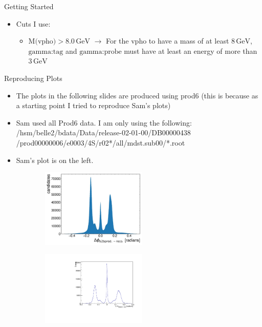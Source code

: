 \documentclass[10pt]{beamer}
\begin{document}
{\begin{frame}{Getting Started}
\begin{itemize}
\end{itemize}

\begin{itemize}
	\item Cuts I use:
	\begin{itemize}
		\item $\textrm{M(vpho)}>8.0\, \textrm{GeV}$ $\rightarrow$ For the vpho to have a mass of at least $8\,\textrm{GeV}$, $\textrm{gamma:tag}$ and $\textrm{gamma:probe}$ must have at least an energy of more than $3\,\textrm{GeV}$
	
	\end{itemize}
\end{itemize}

	
\end{frame}

\begin{frame}{Reproducing Plots}
	
	\begin{itemize}
		\item The plots in the following slides are produced using prod6 (this is because as a starting point I tried to reproduce Sam's plots)
		\item Sam used all Prod6 data. I am only using the following: /hsm/belle2/bdata/Data/release-02-01-00/DB00000438 /prod00000006/e0003/4S/r02*/all/mdst.sub00/*.root
		
		\item Sam's plot is on the left.	
		
\end{itemize}
	
	
	\begin{figure}
		\begin{subfigure}{.5\textwidth}
		\centering
		\includegraphics[width=5cm]{Plots/deltaPhiSam.jpeg}
		
		\label{fig:sub1}
	\end{subfigure}%
\begin{subfigure}{.5\textwidth}
\centering
\includegraphics[width=5cm]{Plots/DeltaPhi.pdf}


\end{subfigure}
\end{figure}
\end{frame}}
\end{document}
